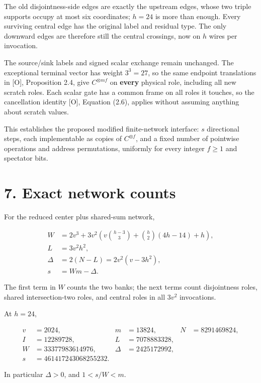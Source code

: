 \documentclass[
  11pt,
  letterpaper,
]{article}
\begin{document}
The old disjointness-side edges are exactly the upstream edges, whose
two triple supports occupy at most six coordinates; \(h=24\) is more
than enough. Every surviving central edge has the original label and
residual type. The only downward edges are therefore still the central
crossings, now on \(h\) wires per invocation.

The source/sink labels and signed scalar exchange remain unchanged. The
exceptional terminal vector has weight \(3^3=27\), so the same endpoint
translations in {[}O{]}, Proposition 2.4, give \(C^{\otimes mf}\) on
\textbf{every} physical role, including all new scratch roles. Each
scalar gate has a common frame on all roles it touches, so the
cancellation identity {[}O{]}, Equation (2.6), applies without assuming
anything about scratch values.

This establishes the proposed modified finite-network interface: \(s\)
directional steps, each implementable as copies of \(C^{\otimes f}\),
and a fixed number of pointwise operations and address permutations,
uniformly for every integer \(f\ge1\) and spectator bits.

\section{7. Exact network counts}\label{exact-network-counts}

For the reduced center plus shared-sum network,

\[
\begin{aligned}
W&=2v^3+3v^2\left(v\binom{h-3}{3}+\binom h2(4h-14)+h\right),\\
L&=3v^2h^2,\\
\Delta&=2(N-L)=2v^2(v-3h^2),\\
s&=Wm-\Delta.
\end{aligned}
\]

The first term in \(W\) counts the two banks; the next terms count
disjointness roles, shared intersection-two roles, and central roles in
all \(3v^2\) invocations.

At \(h=24\),

\[
\begin{aligned}
v&=2024,&m&=13824,&N&=8291469824,\\
I&=12289728,&L&=7078883328,\\
W&=33377983614976,&\Delta&=2425172992,\\
s&=461417243068255232.
\end{aligned}
\]

In particular \(\Delta>0\), and \(1<s/W<m\).
\end{document}
